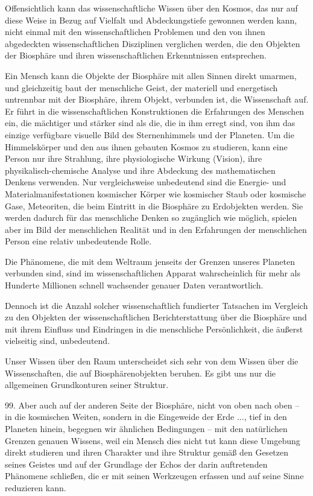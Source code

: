 \documentclass[11pt,a4paper]{book}
\begin{document}
Offensichtlich kann das wissenschaftliche Wissen über den Kosmos, das nur auf diese Weise in Bezug auf Vielfalt und Abdeckungstiefe gewonnen werden kann, nicht einmal mit den wissenschaftlichen Problemen und den von ihnen abgedeckten wissenschaftlichen Disziplinen verglichen werden, die den Objekten der Biosphäre und ihren wissenschaftlichen Erkenntnissen entsprechen.



Ein Mensch kann die Objekte der Biosphäre mit allen Sinnen direkt umarmen, und gleichzeitig baut der menschliche Geist, der materiell und energetisch untrennbar mit der Biosphäre, ihrem Objekt, verbunden ist, die Wissenschaft auf. Er führt in die wissenschaftlichen Konstruktionen die Erfahrungen des Menschen ein, die mächtiger und stärker sind als die, die in ihm erregt sind, von ihm das einzige verfügbare visuelle Bild des Sternenhimmels und der Planeten. Um die Himmelskörper und den aus ihnen gebauten Kosmos zu studieren, kann eine Person nur ihre Strahlung, ihre physiologische Wirkung (Vision), ihre physikalisch-chemische Analyse und ihre Abdeckung des mathematischen Denkens verwenden. Nur vergleichsweise unbedeutend sind die Energie- und Materialmanifestationen kosmischer Körper wie kosmischer Staub oder kosmische Gase, Meteoriten, die beim Eintritt in die Biosphäre zu Erdobjekten werden. Sie werden dadurch für das menschliche Denken so zugänglich wie möglich, spielen aber im Bild der menschlichen Realität und in den Erfahrungen der menschlichen Person eine relativ unbedeutende Rolle.



Die Phänomene, die mit dem Weltraum jenseits der Grenzen unseres Planeten verbunden sind, sind im wissenschaftlichen Apparat wahrscheinlich für mehr als Hunderte Millionen schnell wachsender genauer Daten verantwortlich.



Dennoch ist die Anzahl solcher wissenschaftlich fundierter Tatsachen im Vergleich zu den Objekten der wissenschaftlichen Berichterstattung über die Biosphäre und mit ihrem Einfluss und Eindringen in die menschliche Persönlichkeit, die äußerst vielseitig sind, unbedeutend.



Unser Wissen über den Raum unterscheidet sich sehr von dem Wissen über die Wissenschaften, die auf Biosphärenobjekten beruhen. Es gibt uns nur die allgemeinen Grundkonturen seiner Struktur.



99. Aber auch auf der anderen Seite der Biosphäre, nicht von oben nach oben -- in die kosmischen Weiten, sondern in die Eingeweide der Erde ..., tief in den Planeten hinein, begegnen wir ähnlichen Bedingungen -- mit den natürlichen Grenzen genauen Wissens, weil ein Mensch dies nicht tut kann diese Umgebung direkt studieren und ihren Charakter und ihre Struktur gemäß den Gesetzen seines Geistes und auf der Grundlage der Echos der darin auftretenden Phänomene schließen, die er mit seinen Werkzeugen erfassen und auf seine Sinne reduzieren kann.
\end{document}
